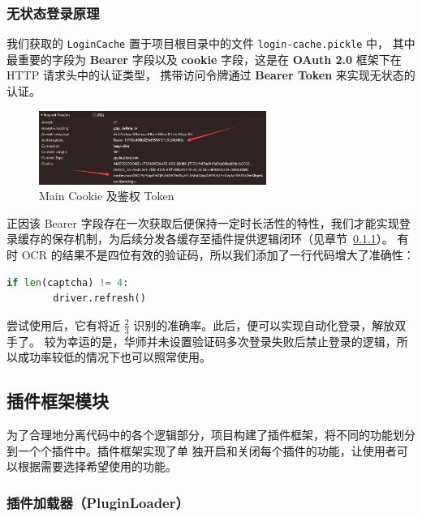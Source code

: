 \documentclass[14pt,a4paper,UTF8,twoside]{article}
\begin{document}
\newpage{} %

\subsubsection{无状态登录原理}

我们获取的 \texttt{LoginCache} 置于项目根目录中的文件 \texttt{login-cache.pickle} 中，
其中最重要的字段为 \textbf{Bearer} 字段以及 \textbf{cookie} 字段，这是在 \textbf{OAuth 2.0} 框架下在 HTTP 请求头中的认证类型，
携带访问令牌通过 \textbf{Bearer Token} 来实现无状态的认证。

\begin{figure}[H]
    \centering
    \includegraphics[width=0.66\textwidth]{img/main_cache.png}
    \caption{Main Cookie 及鉴权 Token}
    \label{fig:main_cache}
\end{figure}

正因该 Bearer 字段存在一次获取后便保持一定时长活性的特性，我们才能实现登录缓存的保存机制，为后续分发各缓存至插件提供逻辑闭环（见章节\ \ref{subsec:plugin_loader}）。
有时 OCR 的结果不是四位有效的验证码，所以我们添加了一行代码增大了准确性：

\begin{lstlisting}[language=Python]
    if len(captcha) != 4:
        driver.refresh()
\end{lstlisting}

尝试使用后，它有将近 $\frac{2}{3}$ 识别的准确率。此后，便可以实现自动化登录，解放双手了。
较为幸运的是，华师并未设置验证码多次登录失败后禁止登录的逻辑，所以成功率较低的情况下也可以照常使用。

\subsection{插件框架模块}

为了合理地分离代码中的各个逻辑部分，项目构建了插件框架，将不同的功能划分到一个个插件中。插件框架实现了单
独开启和关闭每个插件的功能，让使用者可以根据需要选择希望使用的功能。

\subsubsection{插件加载器（PluginLoader）}\label{subsec:plugin_loader}
\end{document}
